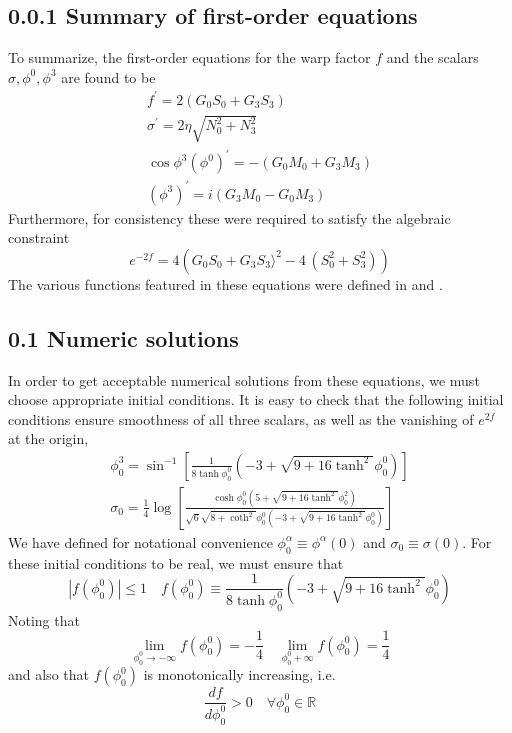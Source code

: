 \documentclass{article}
\begin{document}
\subsection*{0.0.1 Summary of first-order equations}
To summarize, the first-order equations for the warp factor \(f\) and the scalars \(\sigma, \phi^{0}, \phi^{3}\) are found to be
\[
\begin{array}{c}
f^{\prime}=2\left(G_{0}S_{0}+G_{3}S_{3}\right) \\
\sigma^{\prime}=2\eta \sqrt{N_{0}^{2}+N_{3}^{2}} \\
\cos \phi^{3}\left(\phi^{0}\right)^{\prime}=-\left(G_{0}M_{0}+G_{3}M_{3}\right) \\
\left(\phi^{3}\right)^{\prime}=i\left(G_{3}M_{0}-G_{0}M_{3}\right)
\end{array}
\]
Furthermore, for consistency these were required to satisfy the algebraic constraint
\[
e^{-2f}=4\left(G_{0}S_{0}+G_{3}S_{3}\rangle^{2}-4\,\left(S_{0}^{2}+S_{3}^{2}\right)\right)
\]
The various functions featured in these equations were defined in and .
\subsection*{0.1 Numeric solutions}
In order to get acceptable numerical solutions from these equations, we must choose appropriate initial conditions. It is easy to check that the following initial conditions ensure smoothness of all three scalars, as well as the vanishing of \(e^{2 f}\) at the origin,
\[
\begin{array}{c}
\phi_{0}^{3}=\sin ^{-1}\left[\frac{1}{8\tanh \phi_{0}^{0}}\left(-3+\sqrt{9+16\tanh ^{2}}\phi_{0}^{0}\right)\right] \\
\sigma_{0}=\frac{1}{4}\log \left[\frac{\cosh \phi_{0}^{0}\left(5+\sqrt{9+16\tanh ^{2}}\phi_{0}^{2}\right)}{\sqrt{6}\sqrt{8+\coth ^{2}}\phi_{0}^{0}\left(-3+\sqrt{9+16\tanh ^{2}}\phi_{\mathrm{0}}^{0}\right)}\right]
\end{array}
\]
We have defined for notational convenience \(\phi_{0}^{\alpha} \equiv \phi^{\alpha}(0)\) and \(\sigma_{0} \equiv \sigma(0)\). For these initial conditions to be real, we must ensure that
\[
\left|f\left(\phi_{0}^{0}\right)\right| \leq 1 \quad f\left(\phi_{0}^{0}\right) \equiv \frac{1}{8\tanh \phi_{0}^{0}}\left(-3 + \sqrt{9+16\tanh ^{2}}\phi_{0}^{0} \right)
\]
Noting that
\[
\lim _{\phi_{0}^{0} \rightarrow -\infty} f\left(\phi_{0}^{0}\right)=-\frac{1}{4} \quad \lim _{\phi_{0}^{0}+\infty} f\left(\phi_{0}^{0}\right)=\frac{1}{4}
\]
and also that \(f\left(\phi_{0}^{0}\right)\) is monotonically increasing, i.e.
\[
\frac{d f}{d \phi_{0}^{0}}>0 \quad \forall \phi_{0}^{0} \in \mathbb{R}
\]
\end{document}
